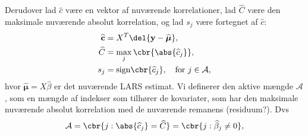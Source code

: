 %
%
Derudover lad $\widehat{c}$ være en vektor af nuværende korrelationer, lad $\widehat{C}$ være den maksimale nuværende absolut korrelation, og lad $s_j$ være fortegnet af $\widehat{c}$: 
%
\begin{align*}
 \widehat{\textbf{c}} & = X^T \del{ \textbf{y}- \widehat{\boldsymbol{\mu}}}, \\
 \widehat{C} & = \max_j \cbr{\abs{\widehat{c}_j}}, \\
 s_j &  = \text{sign} \cbr{\widehat{c}_j}, \quad \text{for } j \in \mathcal{A},
\end{align*}
%
hvor $\widehat{\boldsymbol{\mu}} = X \widehat{\beta}$ er det nuværende LARS estimat. Vi definerer den aktive mængde $\mathcal{A}$, som en mængde af indekser som tilhører de kovariater, som har den maksimale nuværende absolut korrelation med de nuværende remanens (residuum?).  Dvs 
\begin{align*}
\mathcal{A} = \cbr{j : \abs{\widehat{c}_j} = \widehat{C}} = \cbr{j : \widehat{\beta}_j \neq 0},
\end{align*}

